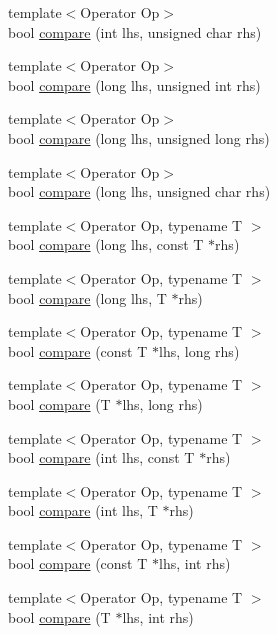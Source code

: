 \begin{DoxyCompactItemize}
\item 
{\footnotesize template$<$Operator Op$>$ }\\bool \hyperlink{namespaceCatch_1_1Internal_a7e82d987f62b9822107027c72a55fa6b}{compare} (int lhs, unsigned char rhs)
\item 
{\footnotesize template$<$Operator Op$>$ }\\bool \hyperlink{namespaceCatch_1_1Internal_a0b4783ede1901e5c1baf8ff909bcce8d}{compare} (long lhs, unsigned int rhs)
\item 
{\footnotesize template$<$Operator Op$>$ }\\bool \hyperlink{namespaceCatch_1_1Internal_ae9aec44a08d9cbb0d3dd46d438b50d2c}{compare} (long lhs, unsigned long rhs)
\item 
{\footnotesize template$<$Operator Op$>$ }\\bool \hyperlink{namespaceCatch_1_1Internal_a79664b5f5f497fba57bd156e098de1f2}{compare} (long lhs, unsigned char rhs)
\item 
{\footnotesize template$<$Operator Op, typename T $>$ }\\bool \hyperlink{namespaceCatch_1_1Internal_a0e8dab2dbe3d4488587b7c98c1af28a2}{compare} (long lhs, const T $\ast$rhs)
\item 
{\footnotesize template$<$Operator Op, typename T $>$ }\\bool \hyperlink{namespaceCatch_1_1Internal_a829570ad9e724c687aa42190a696032b}{compare} (long lhs, T $\ast$rhs)
\item 
{\footnotesize template$<$Operator Op, typename T $>$ }\\bool \hyperlink{namespaceCatch_1_1Internal_a613e00432af431eb9e4187980cb2b576}{compare} (const T $\ast$lhs, long rhs)
\item 
{\footnotesize template$<$Operator Op, typename T $>$ }\\bool \hyperlink{namespaceCatch_1_1Internal_a3f89c65fdb06aa7b648c5acf0ca107a9}{compare} (T $\ast$lhs, long rhs)
\item 
{\footnotesize template$<$Operator Op, typename T $>$ }\\bool \hyperlink{namespaceCatch_1_1Internal_a580d84cb4ae2eea380612e14070c7d40}{compare} (int lhs, const T $\ast$rhs)
\item 
{\footnotesize template$<$Operator Op, typename T $>$ }\\bool \hyperlink{namespaceCatch_1_1Internal_a4f30c29e4adb62c7e209e5b988e59397}{compare} (int lhs, T $\ast$rhs)
\item 
{\footnotesize template$<$Operator Op, typename T $>$ }\\bool \hyperlink{namespaceCatch_1_1Internal_a95459432caca2e58ae28afedd5faed99}{compare} (const T $\ast$lhs, int rhs)
\item 
{\footnotesize template$<$Operator Op, typename T $>$ }\\bool \hyperlink{namespaceCatch_1_1Internal_a95361ddae55c9a390e6510bdadccb1fc}{compare} (T $\ast$lhs, int rhs)
\end{DoxyCompactItemize}


